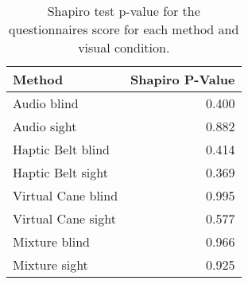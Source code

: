 
\begin{table}[!htb]
\centering
\caption{Shapiro test p-value for the questionnaires score for each method and visual condition.}
\label{tab:shapiro_questionnaires}
\begin{tabular}{lr}
\toprule
            Method &  Shapiro P-Value \\
\midrule
       Audio blind &            0.400 \\
       Audio sight &            0.882 \\
 Haptic Belt blind &            0.414 \\
 Haptic Belt sight &            0.369 \\
Virtual Cane blind &            0.995 \\
Virtual Cane sight &            0.577 \\
     Mixture blind &            0.966 \\
     Mixture sight &            0.925 \\
\bottomrule
\end{tabular}
\end{table}

